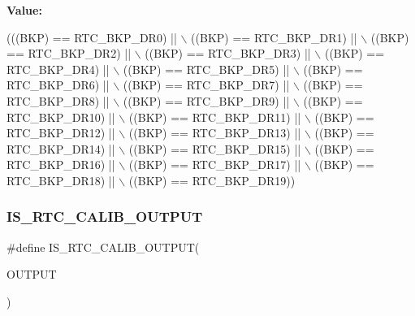 {\bfseries Value\+:}
\begin{DoxyCode}
(((BKP) == RTC\_BKP\_DR0)  || \(\backslash\)
                                           ((BKP) == RTC\_BKP\_DR1)  || \(\backslash\)
                                           ((BKP) == RTC\_BKP\_DR2)  || \(\backslash\)
                                           ((BKP) == RTC\_BKP\_DR3)  || \(\backslash\)
                                           ((BKP) == RTC\_BKP\_DR4)  || \(\backslash\)
                                           ((BKP) == RTC\_BKP\_DR5)  || \(\backslash\)
                                           ((BKP) == RTC\_BKP\_DR6)  || \(\backslash\)
                                           ((BKP) == RTC\_BKP\_DR7)  || \(\backslash\)
                                           ((BKP) == RTC\_BKP\_DR8)  || \(\backslash\)
                                           ((BKP) == RTC\_BKP\_DR9)  || \(\backslash\)
                                           ((BKP) == RTC\_BKP\_DR10) || \(\backslash\)
                                           ((BKP) == RTC\_BKP\_DR11) || \(\backslash\)
                                           ((BKP) == RTC\_BKP\_DR12) || \(\backslash\)
                                           ((BKP) == RTC\_BKP\_DR13) || \(\backslash\)
                                           ((BKP) == RTC\_BKP\_DR14) || \(\backslash\)
                                           ((BKP) == RTC\_BKP\_DR15) || \(\backslash\)
                                           ((BKP) == RTC\_BKP\_DR16) || \(\backslash\)
                                           ((BKP) == RTC\_BKP\_DR17) || \(\backslash\)
                                           ((BKP) == RTC\_BKP\_DR18) || \(\backslash\)
                                           ((BKP) == RTC\_BKP\_DR19))
\end{DoxyCode}
\mbox{\label{group___r_t_c_ex___i_s___r_t_c___definitions_gae8326e278569669e6880388c85cd890a}} 
\subsubsection{\texorpdfstring{I\+S\+\_\+\+R\+T\+C\+\_\+\+C\+A\+L\+I\+B\+\_\+\+O\+U\+T\+P\+UT}{IS\_RTC\_CALIB\_OUTPUT}}
{\footnotesize\ttfamily \#define I\+S\+\_\+\+R\+T\+C\+\_\+\+C\+A\+L\+I\+B\+\_\+\+O\+U\+T\+P\+UT(\begin{DoxyParamCaption}\item[{}]{O\+U\+T\+P\+UT }\end{DoxyParamCaption})}

